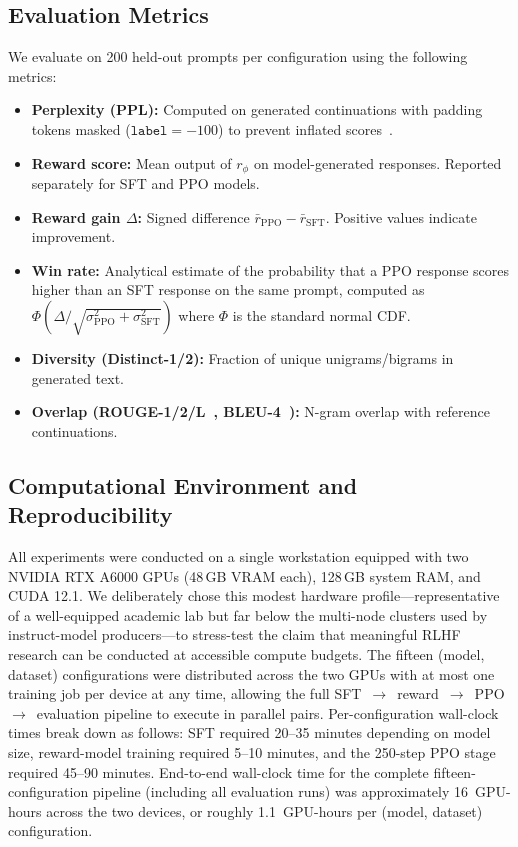 \documentclass[10pt,twocolumn,letterpaper]{article}
\begin{document}
\subsection{Evaluation Metrics}
\label{sec:metrics}

We evaluate on 200 held-out prompts per configuration using the following metrics:

\begin{itemize}[topsep=2pt, itemsep=1pt]
  \item \textbf{Perplexity (PPL):} Computed on generated continuations with padding tokens masked ($\texttt{label}=-100$) to prevent inflated scores~\cite{merity2016pointer}.
  \item \textbf{Reward score:} Mean output of $r_\phi$ on model-generated responses. Reported separately for SFT and PPO models.
  \item \textbf{Reward gain $\Delta$:} Signed difference $\bar{r}_\text{PPO} - \bar{r}_\text{SFT}$. Positive values indicate improvement.
  \item \textbf{Win rate:} Analytical estimate of the probability that a PPO response scores higher than an SFT response on the same prompt, computed as $\Phi\!\left(\Delta / \sqrt{\sigma_\text{PPO}^2 + \sigma_\text{SFT}^2}\right)$ where $\Phi$ is the standard normal CDF.
  \item \textbf{Diversity (Distinct-1/2):} Fraction of unique unigrams/bigrams in generated text.
  \item \textbf{Overlap (ROUGE-1/2/L~\cite{lin2004rouge}, BLEU-4~\cite{papineni2002bleu}):} N-gram overlap with reference continuations.
\end{itemize}

\subsection{Computational Environment and Reproducibility}
\label{sec:hardware}

All experiments were conducted on a single workstation equipped with two NVIDIA RTX A6000 GPUs (48\,GB VRAM each), 128\,GB system RAM, and CUDA 12.1. We deliberately chose this modest hardware profile---representative of a well-equipped academic lab but far below the multi-node clusters used by instruct-model producers---to stress-test the claim that meaningful RLHF research can be conducted at accessible compute budgets. The fifteen (model, dataset) configurations were distributed across the two GPUs with at most one training job per device at any time, allowing the full SFT~$\to$~reward~$\to$~PPO~$\to$~evaluation pipeline to execute in parallel pairs. Per-configuration wall-clock times break down as follows: SFT required 20--35 minutes depending on model size, reward-model training required 5--10 minutes, and the 250-step PPO stage required 45--90 minutes. End-to-end wall-clock time for the complete fifteen-configuration pipeline (including all evaluation runs) was approximately 16~GPU-hours across the two devices, or roughly 1.1~GPU-hours per (model, dataset) configuration.
\end{document}
